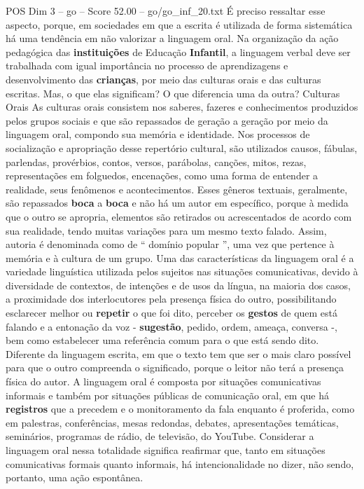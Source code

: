 \begin{textsample}{POS Dim 3 – go – Score 52.00 – go/go\_inf\_20.txt}
É preciso ressaltar esse aspecto, porque, em sociedades em que a escrita é utilizada de forma sistemática há uma tendência em não valorizar a linguagem oral.
Na organização da ação pedagógica das \textbf{instituições} de Educação \textbf{Infantil}, a linguagem verbal deve ser trabalhada com igual importância no processo de aprendizagens e desenvolvimento das \textbf{crianças}, por meio das culturas orais e das culturas escritas.
Mas, o que elas significam?
O que diferencia uma da outra?
Culturas Orais As culturas orais consistem nos saberes, fazeres e conhecimentos produzidos pelos grupos sociais e que são repassados de geração a geração por meio da linguagem oral, compondo sua memória e identidade.
Nos processos de socialização e apropriação desse repertório cultural, são utilizados causos, fábulas, parlendas, provérbios, contos, versos, parábolas, canções, mitos, rezas, representações em folguedos, encenações, como uma forma de entender a realidade, seus fenômenos e acontecimentos.
Esses gêneros textuais, geralmente, são repassados \textbf{boca} a \textbf{boca} e não há um autor em específico, porque à medida que o outro se apropria, elementos são retirados ou acrescentados de acordo com sua realidade, tendo muitas variações para um mesmo texto falado.
Assim, autoria é denominada como de “ domínio popular ”, uma vez que pertence à memória e à cultura de um grupo.
Uma das características da linguagem oral é a variedade linguística utilizada pelos sujeitos nas situações comunicativas, devido à diversidade de contextos, de intenções e de usos da língua, na maioria dos casos, a proximidade dos interlocutores pela presença física do outro, possibilitando esclarecer melhor ou \textbf{repetir} o que foi dito, perceber os \textbf{gestos} de quem está falando e a entonação da voz - \textbf{sugestão}, pedido, ordem, ameaça, conversa -, bem como estabelecer uma referência comum para o que está sendo dito.
Diferente da linguagem escrita, em que o texto tem que ser o mais claro possível para que o outro compreenda o significado, porque o leitor não terá a presença física do autor.
A linguagem oral é composta por situações comunicativas informais e também por situações públicas de comunicação oral, em que há \textbf{registros} que a precedem e o monitoramento da fala enquanto é proferida, como em palestras, conferências, mesas redondas, debates, apresentações temáticas, seminários, programas de rádio, de televisão, do YouTube.
Considerar a linguagem oral nessa totalidade significa reafirmar que, tanto em situações comunicativas formais quanto informais, há intencionalidade no dizer, não sendo, portanto, uma ação espontânea.

\end{textsample}
